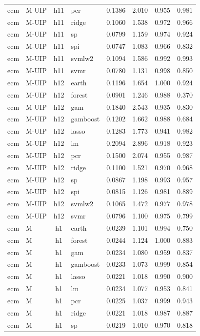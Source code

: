 \begin{ThreePartTable}
\begin{longtable}[t]{llclcccc}
ecm & M-UIP & h11 & pcr & 0.1386 & 2.010 & 0.955 & 0.981\\
ecm & M-UIP & h11 & ridge & 0.1060 & 1.538 & 0.972 & 0.966\\
ecm & M-UIP & h11 & sp & 0.0799 & 1.159 & 0.974 & 0.924\\
ecm & M-UIP & h11 & spi & 0.0747 & 1.083 & 0.966 & 0.832\\
ecm & M-UIP & h11 & svmlw2 & 0.1094 & 1.586 & 0.992 & 0.993\\
ecm & M-UIP & h11 & svmr & 0.0780 & 1.131 & 0.998 & 0.850\\
\addlinespace
ecm & M-UIP & h12 & earth & 0.1196 & 1.654 & 1.000 & 0.924\\
ecm & M-UIP & h12 & forest & 0.0901 & 1.246 & 0.988 & 0.370\\
ecm & M-UIP & h12 & gam & 0.1840 & 2.543 & 0.935 & 0.830\\
ecm & M-UIP & h12 & gamboost & 0.1202 & 1.662 & 0.988 & 0.684\\
ecm & M-UIP & h12 & lasso & 0.1283 & 1.773 & 0.941 & 0.982\\
ecm & M-UIP & h12 & lm & 0.2094 & 2.896 & 0.918 & 0.923\\
ecm & M-UIP & h12 & pcr & 0.1500 & 2.074 & 0.955 & 0.987\\
ecm & M-UIP & h12 & ridge & 0.1100 & 1.521 & 0.970 & 0.968\\
ecm & M-UIP & h12 & sp & 0.0867 & 1.198 & 0.993 & 0.957\\
ecm & M-UIP & h12 & spi & 0.0815 & 1.126 & 0.981 & 0.889\\
ecm & M-UIP & h12 & svmlw2 & 0.1065 & 1.472 & 0.977 & 0.978\\
ecm & M-UIP & h12 & svmr & 0.0796 & 1.100 & 0.975 & 0.799\\
\addlinespace
ecm & M & h1 & earth & 0.0239 & 1.101 & 0.994 & 0.750\\
ecm & M & h1 & forest & 0.0244 & 1.124 & 1.000 & 0.883\\
ecm & M & h1 & gam & 0.0234 & 1.080 & 0.959 & 0.837\\
ecm & M & h1 & gamboost & 0.0233 & 1.073 & 0.999 & 0.854\\
ecm & M & h1 & lasso & 0.0221 & 1.018 & 0.990 & 0.900\\
ecm & M & h1 & lm & 0.0234 & 1.077 & 0.953 & 0.841\\
ecm & M & h1 & pcr & 0.0225 & 1.037 & 0.999 & 0.943\\
ecm & M & h1 & ridge & 0.0221 & 1.018 & 0.987 & 0.887\\
ecm & M & h1 & sp & 0.0219 & 1.010 & 0.970 & 0.818\\

\end{longtable}
\end{ThreePartTable}
